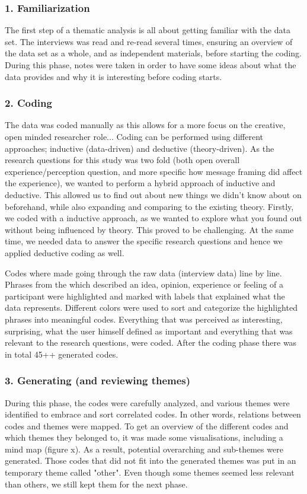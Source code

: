     \subsubsection{1. Familiarization}
    The first step of a thematic analysis is all about getting familiar with the data set. The interviews was read and re-read several times, ensuring an overview of the data set as a whole, and as independent materials, before starting the coding. During this phase, notes were taken in order to have some ideas about what the data provides and why it is interesting before coding starts.
    
    \subsubsection{2. Coding}
    The data was coded manually as this allows for a more focus on the creative, open minded researcher role... 
   Coding can be performed using different approaches; inductive (data-driven) and deductive (theory-driven). As the research questions for this study was two fold (both open overall experience/perception question, and more specific how message framing did affect the experience), we wanted to perform a hybrid approach of inductive and deductive. This allowed us to find out about new things we didn't know about on beforehand, while also expanding and comparing to the existing theory. 
   Firstly, we coded with a inductive approach, as we wanted to explore what you found out without being influenced by theory.  This proved to be challenging. At the same time, we needed data to answer the specific research questions and hence we applied deductive coding as well. 
    
    Codes where made going through the raw data (interview data) line by line. Phrases from the which described an idea, opinion, experience or feeling of a participant were highlighted and marked with labels that explained what the data represents. Different colors were used to sort and categorize the highlighted phrases into meaningful codes. Everything that was perceived as interesting, surprising, what the user himself defined as important and everything that was relevant to the research questions, were coded.  After the coding phase there was in total 45++ generated codes.  
    \subsubsection{3. Generating (and reviewing themes)}
During this phase, the codes were carefully analyzed, and various themes were identified to embrace and sort correlated codes. In other words, relations between codes and themes were mapped. To get an overview of the different codes and which themes they belonged to, it was made some visualisations, including a mind map (figure x). As a result, potential overarching and sub-themes were generated. Those codes that did not fit into the generated themes was put in an temporary theme called "other". Even though some themes seemed less relevant than others, we still kept them for the next phase. 

